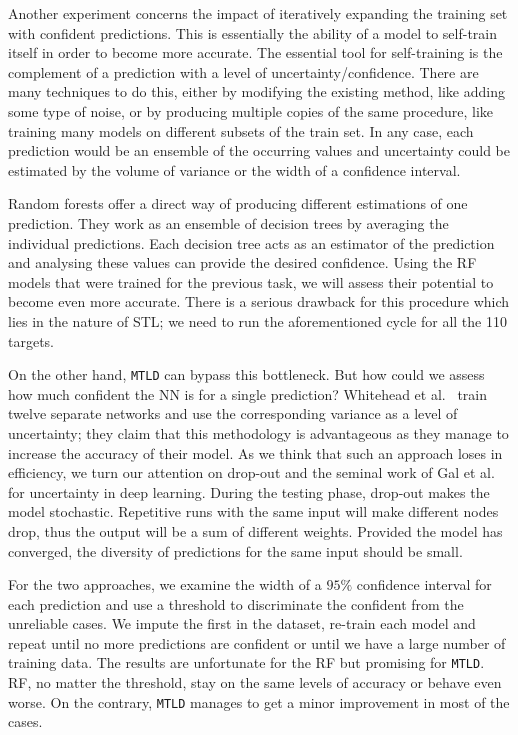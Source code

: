 \documentclass[10pt]{article}
\begin{document}
Another experiment concerns the impact of iteratively expanding the training set with confident predictions. This is essentially the ability of a model to self-train itself in order to become more accurate. The essential tool for self-training is the complement of a prediction with a level of uncertainty/confidence. There are many techniques to do this, either by modifying the existing method, like adding some type of noise, or by producing multiple copies of the same procedure, like training many models on different subsets of the train set. In any case, each prediction would be an ensemble of the occurring values and uncertainty could be estimated by the volume of variance or the width of a confidence interval.   

Random forests offer a direct way of producing different estimations of one prediction. They work as an ensemble of decision trees by averaging the individual predictions. Each decision tree acts as an estimator of the prediction and analysing these values can provide the desired confidence. Using the RF models that were trained for the previous task, we will assess their potential to become even more accurate. There is a serious drawback for this procedure which lies in the nature of STL; we need to run the aforementioned cycle for all the 110 targets.

On the other hand, \texttt{MTLD} can bypass this bottleneck. But how could we assess how much confident the NN is for a single prediction? Whitehead et al.~\cite{whitehead2019imputation} train twelve separate networks and use the corresponding variance as a level of uncertainty; they claim that this methodology is advantageous as they manage to increase the accuracy of their model. As we think that such an approach loses in efficiency, we turn our attention on drop-out and the seminal work of Gal et al.~\cite{gal2016dropout} for uncertainty in deep learning. During the testing phase, drop-out makes the model stochastic. Repetitive runs with the same input will make different nodes drop, thus the output will be a sum of different weights. Provided the model has converged, the diversity of predictions for the same input should be small.

For the two approaches, we examine the width of a $95\%$ confidence interval for each prediction and use a threshold to discriminate the confident from the unreliable cases. We impute the first in the dataset, re-train each model and repeat until no more predictions are confident or until we have a large number of training data. The results are unfortunate for the RF but promising for \texttt{MTLD}. RF, no matter the threshold, stay on the same levels of accuracy or behave even worse. On the contrary, \texttt{MTLD} manages to get a minor improvement in most of the cases.  
\end{document}
